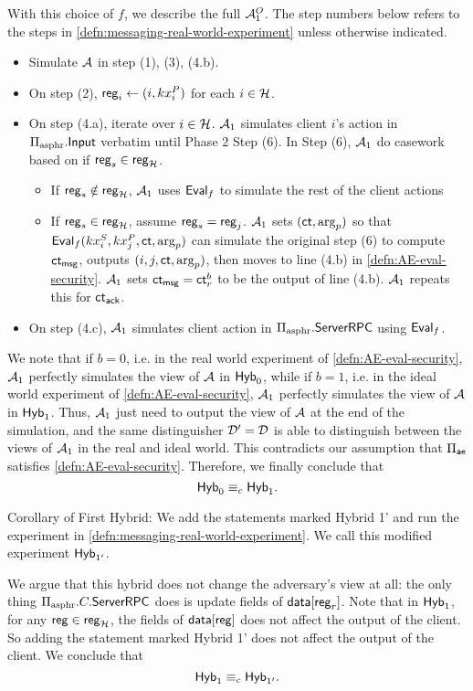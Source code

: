 With this choice of $f$, we describe the full $\mathcal{A}_1^O$. The step numbers below refers to the steps in \cref{defn:messaging-real-world-experiment} unless otherwise indicated.
\begin{itemize}
    \item Simulate $\mathcal{A}$ in step (1), (3), (4.b).
    \item On step (2), $\mathsf{reg}_i \leftarrow (i, kx_i^{P})$ for each $i \in \mathcal{H}$. 
    \item On step (4.a), iterate over $i \in \mathcal{H}$. $\mathcal{A}_1$ simulates client $i$'s action in $\Pi_{\text{asphr}}.\mathsf{Input}$ verbatim until Phase 2 Step (6). In Step (6), $\mathcal{A}_1$ do casework based on if $\mathsf{reg}_s \in \mathsf{reg}_{\mathcal{H}}$. 
    \begin{itemize}
        \item  If $\mathsf{reg}_s \notin \mathsf{reg}_{\mathcal{H}}$, $\mathcal{A}_1$ uses $\mathsf{Eval}_f$ to simulate the rest of the client actions
        \item  If $\mathsf{reg}_s \in \mathsf{reg}_{\mathcal{H}}$, assume $\mathsf{reg}_s = \mathsf{reg}_j$. $\mathcal{A}_1$ sets $(\mathsf{ct}, \arg_p)$ so that $\mathsf{Eval}_f(kx^S_i, kx^P_j, \mathsf{ct}, \arg_p)$ can simulate the original step (6) to compute $\mathsf{ct}_{\mathsf{msg}}$, outputs $(i, j, \mathsf{ct}, \arg_p)$, then moves to line (4.b) in \cref{defn:AE-eval-security}. $\mathcal{A}_1$ sets $\mathsf{ct}_{\mathsf{msg}} = \mathsf{ct}^b_r$ to be the output of line (4.b). $\mathcal{A}_1$ repeats this for $\mathsf{ct}_{\mathsf{ack}}$.
    \end{itemize}
   
    \item On step (4.c), $\mathcal{A}_1$ simulates client action in $\Pi_{\text{asphr}}.\mathsf{ServerRPC}$ using $\mathsf{Eval}_f$.
\end{itemize}
We note that if $b = 0$, i.e. in the real world experiment of \cref{defn:AE-eval-security}, $\mathcal{A}_1$ perfectly simulates the view of $\mathcal{A}$ in $\mathsf{Hyb}_0$, while if $b = 1$, i.e. in the ideal world experiment of \cref{defn:AE-eval-security}, $\mathcal{A}_1$ perfectly simulates the view of $\mathcal{A}$ in $\mathsf{Hyb}_1$. Thus, $\mathcal{A}_1$ just need to output the view of $\mathcal{A}$ at the end of the simulation, and the same distinguisher $\mathcal{D}' = \mathcal{D}$ is able to distinguish between the views of $\mathcal{A}_1$ in the real and ideal world. This contradicts our assumption that $\Pi_{\mathsf{ae}}$ satisfies \cref{defn:AE-eval-security}. Therefore, we finally conclude that
$$\mathsf{Hyb}_0 \equiv_c \mathsf{Hyb}_1.$$

Corollary of First Hybrid: We add the statements marked Hybrid 1' and run the experiment in \cref{defn:messaging-real-world-experiment}. We call this modified experiment $\mathsf{Hyb}_{1'}$.

We argue that this hybrid does not change the adversary's view at all: the only thing $\Pi_{\text{asphr}}.C.\mathsf{ServerRPC}$ does is update fields of $\mathsf{data}[\mathsf{reg}_r]$. Note that in $\mathsf{Hyb}_1$, for any $\mathsf{reg} \in \mathsf{reg}_{\mathcal{H}}$, the fields of $\mathsf{data}[\mathsf{reg}]$ does not affect the output of the client. So adding the statement marked Hybrid 1' does not affect the output of the client. We conclude that
$$\mathsf{Hyb}_1 \equiv_c \mathsf{Hyb}_{1'}.$$

